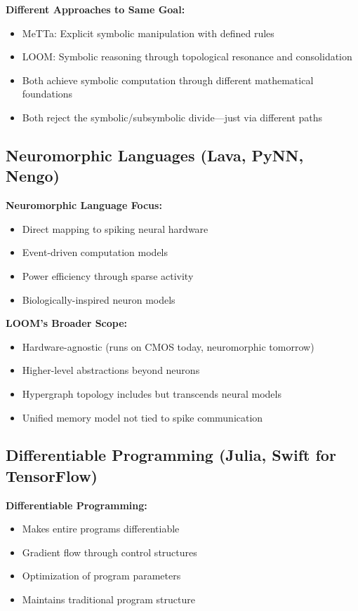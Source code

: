 \documentclass[12pt,a4paper,openany]{book} %
\begin{document}
\textbf{Different Approaches to Same Goal:}
\begin{itemize}
\item MeTTa: Explicit symbolic manipulation with defined rules
\item LOOM: Symbolic reasoning through topological resonance and consolidation
\item Both achieve symbolic computation through different mathematical foundations
\item Both reject the symbolic/subsymbolic divide—just via different paths
\end{itemize}

\subsection{Neuromorphic Languages (Lava, PyNN, Nengo)}

\textbf{Neuromorphic Language Focus:}
\begin{itemize}
\item Direct mapping to spiking neural hardware
\item Event-driven computation models
\item Power efficiency through sparse activity
\item Biologically-inspired neuron models
\end{itemize}

\textbf{LOOM's Broader Scope:}
\begin{itemize}
\item Hardware-agnostic (runs on CMOS today, neuromorphic tomorrow)
\item Higher-level abstractions beyond neurons
\item Hypergraph topology includes but transcends neural models
\item Unified memory model not tied to spike communication
\end{itemize}

\subsection{Differentiable Programming (Julia, Swift for TensorFlow)}

\textbf{Differentiable Programming:}
\begin{itemize}
\item Makes entire programs differentiable
\item Gradient flow through control structures
\item Optimization of program parameters
\item Maintains traditional program structure
\end{itemize}
\end{document}
